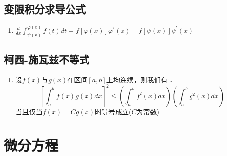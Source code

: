 \documentclass[12pt,a4paper,UTF8]{book}
\begin{document}
\subsection{变限积分求导公式}
\begin{enumerate}
\item $\frac{d}{dx}\int_{\psi\left(x\right)}^{\varphi\left(x\right)}f\left(t\right)dt=f\left[\varphi\left(x\right)\right]\varphi^\prime\left(x\right)-f\left[\psi\left(x\right)\right]\psi^\prime\left(x\right)$
\end{enumerate}

\subsection{柯西-施瓦兹不等式}
\begin{enumerate}
\item 设$f\left(x\right)$与$g\left(x\right)$在区间$\left[a,b\right]$上均连续，则我们有：
\[\left[\int_{a}^{b}f\left(x\right)g\left(x\right)dx\right]^2\le\left(\int_{a}^{b}f^2\left(x\right)dx\right)\left(\int_{a}^{b}g^2\left(x\right)dx\right)\]
当且仅当$f\left(x\right)=Cg\left(x\right)$时等号成立($C$为常数)
\end{enumerate}


\section{微分方程}
\end{document}
